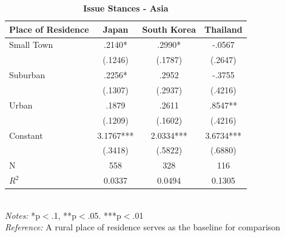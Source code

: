 \documentclass[12pt, titlepage]{article}
\newcommand\e{\emph}
\newcommand\tb{\textbf}
\begin{document}
\begin{singlespace}
	\begin{table}[H]
		\centering 
		\caption{\tb{Issue Stances - Asia}}
		\begin{tabulary}{\linewidth}{l c c c}

			\hline
			\tb{Place of Residence} & \tb{Japan} & \tb{South Korea}&\tb{Thailand}\\
			\hline
			Small Town&.2140*&.2990* &-.0567 \\
			&(.1246)&(.1787)  & (.2647) \\
			Suburban&.2256* &.2952 &-.3755 \\
			&(.1307)&(.2937)  & (.4216) \\
			Urban&.1879&.2611  & .8547**\\
			&(.1209)& (.1602) & (.4216) \\
			Constant&3.1767***&2.0334***  & 3.6734*** \\
			&(.3418)& (.5822)  & (.6880) \\
			N&558&328  & 116  \\
			$R^2$&0.0337& 0.0494 & 0.1305 \\
			\hline
\end{tabulary}
\\
\e{Notes:} *p$<$.1, **p$<$.05. ***p$<$.01 \\
\e{Reference:} A rural place of residence serves as the baseline for comparison
\label{AsiaLib}
\end{table}
\end{singlespace}
\end{document}
